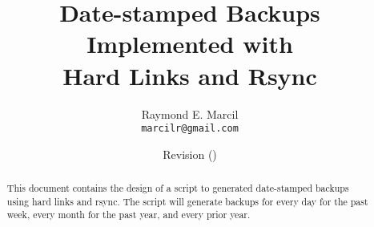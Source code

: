 \documentclass[12pt,letterpaper,dvips]{article}
\title{Date-stamped Backups\\
       Implemented with\\
       Hard Links and Rsync}
\author{Raymond E. Marcil\\
        \texttt{marcilr@gmail.com}
}
\date{Revision \svnInfoRevision
      \hspace{2pt}
      (\svnInfoLongDate)}
\begin{document}
\maketitle

\begin{abstract}
  \noindent This document contains the design of a script to generated date-stamped backups using
  hard links  and rsync.  The script will generate backups for every day for the past week, every
  month for the past year, and every prior year.

\end{abstract}

\vspace{2.0in}



\newpage


\tableofcontents

\newpage
\listoffigures
\listoftables


\newpage

\end{document}
